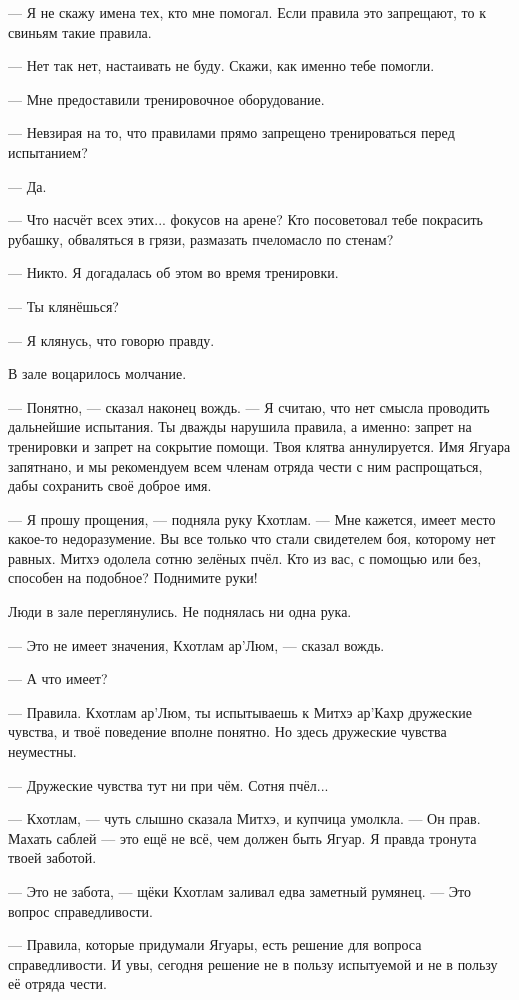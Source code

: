 --- Я не скажу имена тех, кто мне помогал.
Если правила это запрещают, то к свиньям такие правила.

--- Нет так нет, настаивать не буду.
Скажи, как именно тебе помогли.

--- Мне предоставили тренировочное оборудование.

--- Невзирая на то, что правилами прямо запрещено тренироваться перед испытанием?

--- Да.

--- Что насчёт всех этих... фокусов на арене?
Кто посоветовал тебе покрасить рубашку, обваляться в грязи, размазать пчеломасло по стенам?

--- Никто.
Я догадалась об этом во время тренировки.

--- Ты клянёшься?

--- Я клянусь, что говорю правду.

В зале воцарилось молчание.

--- Понятно, --- сказал наконец вождь.
--- Я считаю, что нет смысла проводить дальнейшие испытания.
Ты дважды нарушила правила, а именно: запрет на тренировки и запрет на сокрытие помощи.
Твоя клятва аннулируется.
Имя Ягуара запятнано, и мы рекомендуем всем членам отряда чести с ним распрощаться, дабы сохранить своё доброе имя.

--- Я прошу прощения, --- подняла руку Кхотлам.
--- Мне кажется, имеет место какое-то недоразумение.
Вы все только что стали свидетелем боя, которому нет равных.
Митхэ одолела сотню зелёных пчёл.
Кто из вас, с помощью или без, способен на подобное?
Поднимите руки!

Люди в зале переглянулись.
Не поднялась ни одна рука.

--- Это не имеет значения, Кхотлам ар'Люм, --- сказал вождь.

--- А что имеет?

--- Правила.
Кхотлам ар'Люм, ты испытываешь к Митхэ ар'Кахр дружеские чувства, и твоё поведение вполне понятно.
Но здесь дружеские чувства неуместны.

--- Дружеские чувства тут ни при чём.
Сотня пчёл...

--- Кхотлам, --- чуть слышно сказала Митхэ, и купчица умолкла.
--- Он прав.
Махать саблей --- это ещё не всё, чем должен быть Ягуар.
Я правда тронута твоей заботой.

--- Это не забота, --- щёки Кхотлам заливал едва заметный румянец.
--- Это вопрос справедливости.

--- Правила, которые придумали Ягуары, есть решение для вопроса справедливости.
И увы, сегодня решение не в пользу испытуемой и не в пользу её отряда чести.

